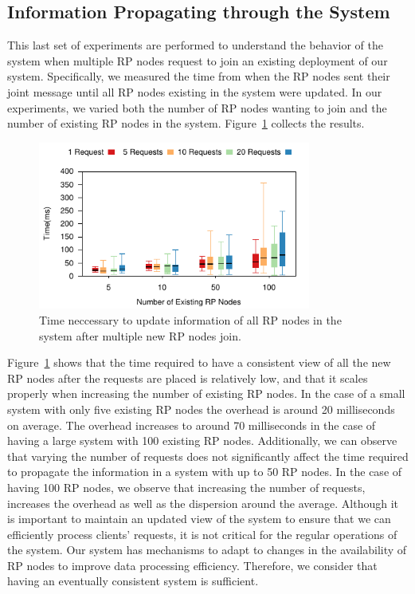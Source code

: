 \subsection{Information Propagating through the System}

This last set of experiments are performed to understand the behavior of the system when multiple RP nodes request to join an existing deployment of our system. Specifically, we measured the time from when the RP nodes sent their joint message until all RP nodes existing in the system were updated. In our experiments, we varied both the number of RP nodes wanting to join and the number of existing RP nodes in the system. Figure~\ref{fig:rpDiscovery} collects the results.

\begin{figure}[htb!]
  \centering
    \includegraphics[width=0.8\textwidth]{Figures/rpDiscoveryBox.pdf}
  \caption{Time neccessary to update information of all RP nodes in the system after multiple new RP nodes join.} \label{fig:rpDiscovery}
\end{figure}

Figure~\ref{fig:rpDiscovery} shows that the time required to have a consistent view of all the new RP nodes after the requests are placed is relatively low, and that it scales properly when increasing the number of existing RP nodes. In the case of a small system with only five existing RP nodes the overhead is around 20 milliseconds on average. The overhead increases to around 70 milliseconds in the case of having a large system with 100 existing RP nodes. Additionally, we can observe that varying the number of requests does not significantly affect the time required to propagate the information in a system with up to 50 RP nodes. In the case of having 100 RP nodes, we observe that increasing the number of requests, increases the overhead as well as the dispersion around the average. Although it is important to maintain an updated view of the system to ensure that we can efficiently process clients' requests, it is not critical for the regular operations of the system. Our system has mechanisms to adapt to changes in the availability of RP nodes to improve data processing efficiency. Therefore, we consider that having an eventually consistent system is sufficient. 

